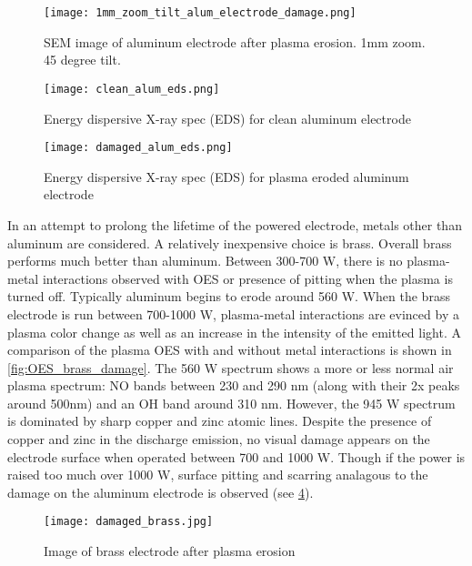 \begin{figure}[htbp]
  \centering
  \texttt{[image: 1mm\_zoom\_tilt\_alum\_electrode\_damage.png]}
  \caption{SEM image of aluminum electrode after plasma erosion. 1mm zoom. 45 degree tilt.}
  \label{fig:alum_damage_1mm}
\end{figure}

\begin{figure}[htbp]
  \centering
  \texttt{[image: clean\_alum\_eds.png]}
  \caption{Energy dispersive X-ray spec (EDS) for clean aluminum electrode}
  \label{fig:EDS_clean_alum}
\end{figure}

\begin{figure}[htbp]
  \centering
  \texttt{[image: damaged\_alum\_eds.png]}
  \caption{Energy dispersive X-ray spec (EDS) for plasma eroded aluminum electrode}
  \label{fig:EDS_damaged_alum}
\end{figure}

In an attempt to prolong the lifetime of the powered electrode, metals other than aluminum are considered. A relatively inexpensive choice is brass. Overall brass performs much better than aluminum. Between 300-700 W, there is no plasma-metal interactions observed with OES or presence of pitting when the plasma is turned off. Typically aluminum begins to erode around 560 W. When the brass electrode is run between 700-1000 W, plasma-metal interactions are evinced by a plasma color change as well as an increase in the intensity of the emitted light. A comparison of the plasma OES with and without metal interactions is shown in \cref{fig:OES_brass_damage}. The 560 W spectrum shows a more or less normal air plasma spectrum: NO bands between 230 and 290 nm (along with their 2x peaks around 500nm) and an OH band around 310 nm. However, the 945 W spectrum is dominated by sharp copper and zinc atomic lines. Despite the presence of copper and zinc in the discharge emission, no visual damage appears on the electrode surface when operated between 700 and 1000 W. Though if the power is raised too much over 1000 W, surface pitting and scarring analagous to the damage on the aluminum electrode is observed (see \cref{fig:brass_damage_full}).

\begin{figure}[htbp]
  \centering
  \texttt{[image: damaged\_brass.jpg]}
  \caption{Image of brass electrode after plasma erosion}
  \label{fig:brass_damage_full}
\end{figure}

